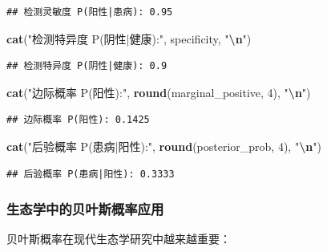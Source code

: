 \documentclass[
]{book}
\newenvironment{Shaded}{\begin{snugshade}}{\end{snugshade}}
\newcommand{\DecValTok}[1]{\textcolor[rgb]{0.00,0.00,0.81}{#1}}
\newcommand{\FunctionTok}[1]{\textcolor[rgb]{0.13,0.29,0.53}{\textbf{#1}}}
\newcommand{\NormalTok}[1]{#1}
\newcommand{\SpecialCharTok}[1]{\textcolor[rgb]{0.81,0.36,0.00}{\textbf{#1}}}
\newcommand{\StringTok}[1]{\textcolor[rgb]{0.31,0.60,0.02}{#1}}
\begin{document}
\begin{verbatim}
## 检测灵敏度 P(阳性|患病): 0.95
\end{verbatim}

\begin{Shaded}
\begin{Highlighting}[]
\FunctionTok{cat}\NormalTok{(}\StringTok{"检测特异度 P(阴性|健康):"}\NormalTok{, specificity, }\StringTok{"}\SpecialCharTok{\textbackslash{}n}\StringTok{"}\NormalTok{)}
\end{Highlighting}
\end{Shaded}

\begin{verbatim}
## 检测特异度 P(阴性|健康): 0.9
\end{verbatim}

\begin{Shaded}
\begin{Highlighting}[]
\FunctionTok{cat}\NormalTok{(}\StringTok{"边际概率 P(阳性):"}\NormalTok{, }\FunctionTok{round}\NormalTok{(marginal\_positive, }\DecValTok{4}\NormalTok{), }\StringTok{"}\SpecialCharTok{\textbackslash{}n}\StringTok{"}\NormalTok{)}
\end{Highlighting}
\end{Shaded}

\begin{verbatim}
## 边际概率 P(阳性): 0.1425
\end{verbatim}

\begin{Shaded}
\begin{Highlighting}[]
\FunctionTok{cat}\NormalTok{(}\StringTok{"后验概率 P(患病|阳性):"}\NormalTok{, }\FunctionTok{round}\NormalTok{(posterior\_prob, }\DecValTok{4}\NormalTok{), }\StringTok{"}\SpecialCharTok{\textbackslash{}n}\StringTok{"}\NormalTok{)}
\end{Highlighting}
\end{Shaded}

\begin{verbatim}
## 后验概率 P(患病|阳性): 0.3333
\end{verbatim}

\hypertarget{ux751fux6001ux5b66ux4e2dux7684ux8d1dux53f6ux65afux6982ux7387ux5e94ux7528}{%
\subsubsection{生态学中的贝叶斯概率应用}\label{ux751fux6001ux5b66ux4e2dux7684ux8d1dux53f6ux65afux6982ux7387ux5e94ux7528}}

贝叶斯概率在现代生态学研究中越来越重要：
\end{document}
